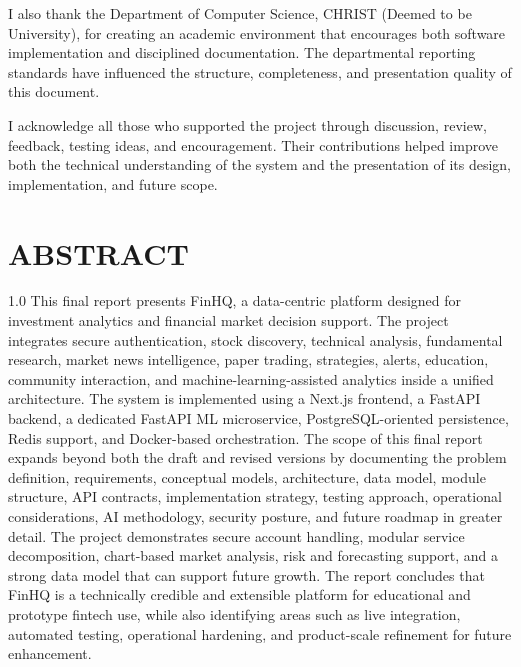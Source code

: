 \documentclass[12pt,a4paper]{report}
\newcommand{\projectshort}{FinHQ}
\begin{document}
I also thank the Department of Computer Science, CHRIST (Deemed to be University), for creating an academic environment that encourages both software implementation and disciplined documentation. The departmental reporting standards have influenced the structure, completeness, and presentation quality of this document.

I acknowledge all those who supported the project through discussion, review, feedback, testing ideas, and encouragement. Their contributions helped improve both the technical understanding of the system and the presentation of its design, implementation, and future scope.

\chapter*{ABSTRACT}
\begin{spacing}{1.0}
This final report presents \projectshort, a data-centric platform designed for investment analytics and financial market decision support. The project integrates secure authentication, stock discovery, technical analysis, fundamental research, market news intelligence, paper trading, strategies, alerts, education, community interaction, and machine-learning-assisted analytics inside a unified architecture. The system is implemented using a Next.js frontend, a FastAPI backend, a dedicated FastAPI ML microservice, PostgreSQL-oriented persistence, Redis support, and Docker-based orchestration. The scope of this final report expands beyond both the draft and revised versions by documenting the problem definition, requirements, conceptual models, architecture, data model, module structure, API contracts, implementation strategy, testing approach, operational considerations, AI methodology, security posture, and future roadmap in greater detail. The project demonstrates secure account handling, modular service decomposition, chart-based market analysis, risk and forecasting support, and a strong data model that can support future growth. The report concludes that \projectshort{} is a technically credible and extensible platform for educational and prototype fintech use, while also identifying areas such as live integration, automated testing, operational hardening, and product-scale refinement for future enhancement.
\end{spacing}

{\pagestyle{empty}\tableofcontents\clearpage}
\listoftables
{}
\clearpage
\listoffigures
{}
\clearpage
\end{document}
